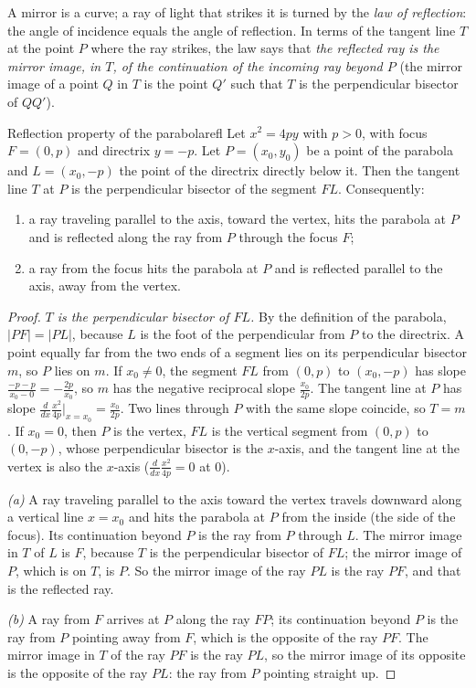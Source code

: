 \documentclass[11pt]{article}
\begin{document}
A mirror is a curve; a ray of light that strikes it is turned by the \emph{law of reflection}: the angle of incidence equals the angle of reflection. In terms of the tangent line $T$ at the point $P$ where the ray strikes, the law says that \emph{the reflected ray is the mirror image, in $T$, of the continuation of the incoming ray beyond $P$} (the mirror image of a point $Q$ in $T$ is the point $Q'$ such that $T$ is the perpendicular bisector of $QQ'$).

\begin{thm}{Reflection property of the parabola}{refl}
Let $x^2=4py$ with $p>0$, with focus $F=(0,p)$ and directrix $y=-p$. Let $P=(x_0,y_0)$ be a point of the parabola and $L=(x_0,-p)$ the point of the directrix directly below it. Then the tangent line $T$ at $P$ is the perpendicular bisector of the segment $FL$. Consequently:
\begin{enumerate}[label=(\alph*)]
  \item a ray traveling parallel to the axis, toward the vertex, hits the parabola at $P$ and is reflected along the ray from $P$ through the focus $F$;
  \item a ray from the focus hits the parabola at $P$ and is reflected parallel to the axis, away from the vertex.
\end{enumerate}
\end{thm}
\begin{proof}
\emph{$T$ is the perpendicular bisector of $FL$.} By the definition of the parabola, $\lvert PF\rvert=\lvert PL\rvert$, because $L$ is the foot of the perpendicular from $P$ to the directrix. A point equally far from the two ends of a segment lies on its perpendicular bisector $m$, so $P$ lies on $m$. If $x_0\ne0$, the segment $FL$ from $(0,p)$ to $(x_0,-p)$ has slope $\frac{-p-p}{x_0-0}=-\frac{2p}{x_0}$, so $m$ has the negative reciprocal slope $\frac{x_0}{2p}$. The tangent line at $P$ has slope $\frac d{dx}\frac{x^2}{4p}\Big|_{x=x_0}=\frac{x_0}{2p}$. Two lines through $P$ with the same slope coincide, so $T=m$. If $x_0=0$, then $P$ is the vertex, $FL$ is the vertical segment from $(0,p)$ to $(0,-p)$, whose perpendicular bisector is the $x$-axis, and the tangent line at the vertex is also the $x$-axis ($\frac{d}{dx}\frac{x^2}{4p}=0$ at $0$).

\emph{(a)} A ray traveling parallel to the axis toward the vertex travels downward along a vertical line $x=x_0$ and hits the parabola at $P$ from the inside (the side of the focus). Its continuation beyond $P$ is the ray from $P$ through $L$. The mirror image in $T$ of $L$ is $F$, because $T$ is the perpendicular bisector of $FL$; the mirror image of $P$, which is on $T$, is $P$. So the mirror image of the ray $PL$ is the ray $PF$, and that is the reflected ray.

\emph{(b)} A ray from $F$ arrives at $P$ along the ray $FP$; its continuation beyond $P$ is the ray from $P$ pointing away from $F$, which is the opposite of the ray $PF$. The mirror image in $T$ of the ray $PF$ is the ray $PL$, so the mirror image of its opposite is the opposite of the ray $PL$: the ray from $P$ pointing straight up.
\end{proof}
\end{document}

